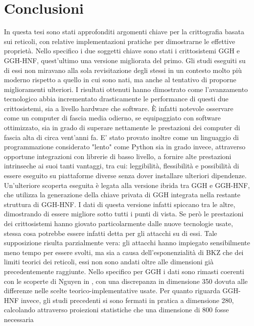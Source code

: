 \chapter{Conclusioni}

In questa tesi sono stati approfonditi argomenti chiave per la crittografia basata sui 
reticoli, con relative implementazioni pratiche per dimostrarne le effettive proprietà. 
Nello specifico i due soggetti chiave sono stati i crittosistemi GGH e GGH-HNF, quest'ultimo
una versione migliorata del primo. Gli studi eseguiti su di essi non miravano alla sola 
revisitazione degli stessi in un contesto molto più moderno rispetto a quello in cui sono 
nati, ma anche al tentativo di proporne miglioramenti ulteriori. I risultati ottenuti hanno 
dimostrato come l'avanzamento tecnologico abbia incrementato drasticamente le performance
di questi due crittosistemi, sia a livello hardware che software. È infatti notevole
osservare come un computer di fascia media odierno, se equipaggiato con software 
ottimizzato, sia in grado di superare nettamente le prestazioni dei computer di fascia 
alta di circa vent'anni fa. E' stato provato inoltre come un linguaggio di programmazione
considerato "lento" come Python sia in grado invece, attraverso opportune integrazioni 
con librerie di basso livello, a fornire alte prestazioni intrinseche ai suoi tanti vantaggi,
tra cui: leggibilità, flessibilità e possibilità di essere eseguito su piattaforme diverse 
senza dover installare ulteriori dipendenze. Un'ulteriore scoperta eseguita è legata 
alla versione ibrida tra GGH e GGH-HNF, che utilizza la generazione della chiave privata
di GGH integrata nella restante struttura di GGH-HNF. I dati di questa versione infatti 
spiccano tra le altre, dimostrando di essere migliore sotto tutti i punti di vista. 
Se però le prestazioni dei crittosistemi hanno giovato particolarmente dalle nuove tecnologie
usate, stessa cosa potrebbe essere infatti detta per gli attacchi su di essi. Tale supposizione risulta
parzialmente vera: gli attacchi hanno impiegato sensibilmente meno tempo per essere svolti, ma 
sia a causa dell'esponenzialità di BKZ che dei limiti teorici dei reticoli, essi non sono 
andati oltre alle dimensioni già precedentemente raggiunte. Nello specifico per GGH i dati 
sono rimasti coerenti con le scoperte di Nguyen in \cite{Nguyen99}, con una discrepanza 
in dimensione 350 dovuta alle differenze nelle scelte teorico-implementative usate. Per 
quanto riguarda GGH-HNF invece, gli studi precedenti si sono fermati in pratica a dimensione
280, calcolando attraverso proiezioni statistiche che una dimensione di 800 fosse necessaria 
